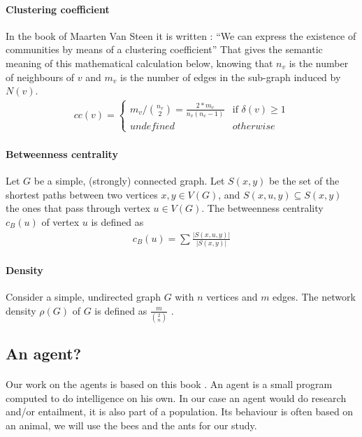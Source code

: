 \documentclass{article}
\begin{document}
		\paragraph{Clustering coefficient}
			In the book of Maarten Van Steen it is written :
			``We can express the existence of communities by means of a clustering coefficient''\cite{Steen10}
			That gives the semantic meaning of this mathematical calculation below,
			knowing that $n_v$ is the number of neighbours of $v$
			and $m_v$ is the number of edges in the sub-graph induced by $N(v)$.
		\begin{align*}
			cc(v) = \begin{cases}
				m_v/ \binom{n_v}{2} = \frac{2*m_v}{n_v(n_v-1)} & \text{if } \delta(v) \ge 1 \\
				undefined & otherwise
			\end{cases}
		\end{align*}
		\paragraph{Betweenness centrality}
			Let $G$ be a simple, (strongly) connected graph.
			Let $S(x, y)$ be the set of the shortest paths between two vertices $x, y \in V(G)$,
			and $S(x, u, y) \subseteq S(x, y)$ the ones that pass through vertex $u \in V (G)$.
			The betweenness centrality $c_B (u)$ of vertex $u$ is defined as
		\begin{align*}
			c_B (u) = \sum \frac{|S(x,u,y)|}{|S(x,y)|}
		\end{align*}
		\paragraph{Density}
			Consider a simple, undirected graph $G$ with $n$ vertices and $m$ edges.
			The network density $\rho(G)$ of $G$ is defined as $\frac{m}{\binom{2}{n}}$ .
	\subsection{An agent?}
		\paragraph{}
			Our work on the agents is based on this book \cite{Engelbrecht05}.
			An agent is a small program computed to do intelligence on his own.
			In our case an agent would do research and/or entailment,
			it is also part of a population.
			Its behaviour is often based on an animal, we will use the bees and the ants for our study.
\end{document}
